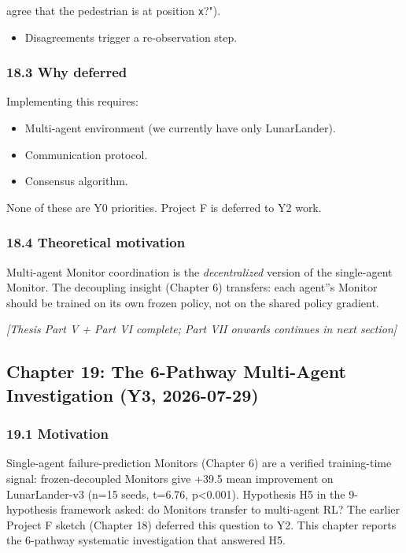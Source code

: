 \documentclass[11pt]{article}
\begin{document}
  agree that the pedestrian is at position \texttt{x}?").
\begin{itemize}
  \item Disagreements trigger a re-observation step.
\end{itemize}


\subsubsection{18.3 Why deferred}

Implementing this requires:

\begin{itemize}
  \item Multi-agent environment (we currently have only LunarLander).
  \item Communication protocol.
  \item Consensus algorithm.
\end{itemize}


None of these are Y0 priorities. Project F is deferred to Y2 work.

\subsubsection{18.4 Theoretical motivation}

Multi-agent Monitor coordination is the \textit{decentralized} version of the
single-agent Monitor. The decoupling insight (Chapter 6) transfers: each
agent''s Monitor should be trained on its own frozen policy, not on the
shared policy gradient.

\hrulefill

\textit{[Thesis Part V + Part VI complete; Part VII onwards continues in next section]}



\hrulefill

\subsection{Chapter 19: The 6-Pathway Multi-Agent Investigation (Y3, 2026-07-29)}

\subsubsection{19.1 Motivation}

Single-agent failure-prediction Monitors (Chapter 6) are a verified
training-time signal: frozen-decoupled Monitors give +39.5 mean
improvement on LunarLander-v3 (n=15 seeds, t=6.76, p<0.001).
Hypothesis H5 in the 9-hypothesis framework asked: do Monitors
transfer to multi-agent RL? The earlier Project F sketch
(Chapter 18) deferred this question to Y2. This chapter reports
the 6-pathway systematic investigation that answered H5.
\end{document}
